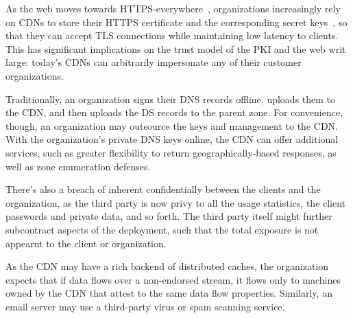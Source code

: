 As the web moves towards HTTPS-everywhere~\cite{felt-2017-https}, organizations
increasingly rely on CDNs to store their HTTPS certificate and the
corresponding secret keys~\cite{key-sharing, when-https-meets-cdn}, so that
they can accept TLS connections while maintaining low latency to clients.
%
This has significant implications on the trust model of the PKI and the web
writ large: today's CDNs can arbitrarily impersonate any of their
customer organizations.

Traditionally, an organization signs their DNS records offline, uploads them to
the CDN, and then uploads the DS records to the parent zone.
%
For convenience, though, an organization may outsource the keys and management
to the CDN\@.
%
With the organization's private DNS keys online, the CDN can offer
additional services, such as greater flexibility to return geographically-based
responses, as well as zone enumeration defenses.



There's also a breach of inherent confidentially between the clients and the
organization, as the third party is now privy to all the usage statistics, the
client passwords and private data, and so forth.
%
The third party itself might further subcontract aspects of the deployment,
such that the total exposure is not appearnt to the client or organization.


As the CDN may have a rich backend of distributed caches, the organization
expects that if data flows over a non-endorsed stream, it flows only to
machines owned by the CDN that attest to the same data flow properties. 
%
Similarly, an email server may use a third-party virus or spam scanning
service.



